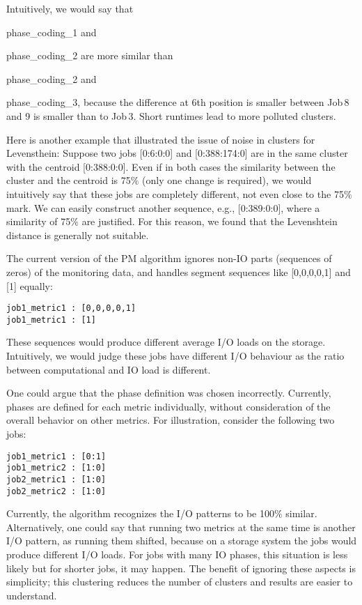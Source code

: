 \documentclass{jhps}
\begin{document}
Intuitively, we would say that {phase\_coding\_1 and{ phase\_coding\_2 are more similar than {phase\_coding\_2 and {phase\_coding\_3, because the difference at 6th position is smaller between Job\,8 and 9 is smaller than to Job\,3.
Short runtimes lead to more polluted clusters.

Here is another example that illustrated the issue of noise in clusters for Levensthein:
Suppose two jobs [0:6:0:0] and [0:388:174:0] are in the same cluster with the centroid [0:388:0:0].
Even if in both cases the similarity between the cluster and the centroid is 75$\%$  (only one change is required), we would intuitively say that these jobs are completely different, not even close to the 75$\%$  mark.
We can easily construct another sequence, e.g., [0:389:0:0], where a similarity of 75$\%$  are justified.
For this reason, we found that the Levenshtein distance is generally not suitable.

\medskip

The current version of the PM algorithm ignores non-IO parts (sequences of zeros) of the monitoring data, and  handles segment sequences like [0,0,0,0,1] and [1] equally:
\begin{lstlisting}
job1_metric1 : [0,0,0,0,1]
job1_metric1 : [1]
\end{lstlisting}

These sequences would produce different average I/O loads on the storage.
Intuitively, we would judge these jobs have different I/O behaviour as the ratio between computational and IO load is different.

One could argue that the phase definition was chosen incorrectly.
Currently, phases are defined for each metric individually, without consideration of the overall behavior on  other metrics.
For illustration, consider the following two jobs:
\begin{lstlisting}
job1_metric1 : [0:1]
job1_metric2 : [1:0]
job2_metric1 : [1:0]
job2_metric2 : [1:0]
\end{lstlisting}

Currently, the algorithm recognizes the I/O patterns to be 100$\%$ similar.
Alternatively, one could say that running two metrics at the same time is another I/O pattern, as running them shifted, because on a storage system the jobs would produce different I/O loads.
For jobs with many IO phases, this situation is less likely but for shorter jobs, it may happen.
The benefit of ignoring these aspects is simplicity; this clustering reduces the number of clusters and  results are easier to understand.

}}}}
\end{document}
